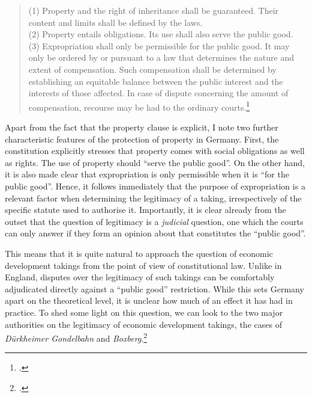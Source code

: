 \begin{quote}
(1) Property and the right of inheritance shall be guaranteed. Their content and limits shall be defined by the laws. \\
(2) Property entails obligations. Its use shall also serve the public good. \\
(3) Expropriation shall only be permissible for the public good. It may only be ordered by or pursuant to a law that determines the nature and extent of compensation. Such compensation shall be determined by establishing an equitable balance between the public interest and the interests of those affected. In case of dispute concerning the amount of compensation, recourse may be had to the ordinary courts.\footcite[14]{basic49}
\end{quote}

Apart from the fact that the property clause is explicit, I note two further characteristic features of the protection of property in Germany. First, the constitution explicitly stresses that property comes with social obligations as well as rights. The use of property should ``serve the public good''. On the other hand, it is also made clear that expropriation is only permissible when it is ``for the public good''. Hence, it follows immediately that the purpose of expropriation is a relevant factor when determining the legitimacy of a taking, irrespectively of the specific statute used to authorise it. Importantly, it is clear already from the outset that the question of legitimacy is a \emph{judicial} question, one which the courts can only answer if they form an opinion about that constitutes the ``public good''. 

This means that it is quite natural to approach the question of economic development takings from the point of view of constitutional law. Unlike in England, disputes over the legitimacy of such takings can be comfortably adjudicated directly against a ``public good'' restriction. While this sets Germany apart on the theoretical level, it is unclear how much of an effect it has had in practice. To shed some light on this question, we can look to the two major authorities on the legitimacy of economic development takings, the cases of {\it Dürkheimer Gondelbahn} and {\it Boxberg}.\footcite{durkheimer81,boxberg86} 

